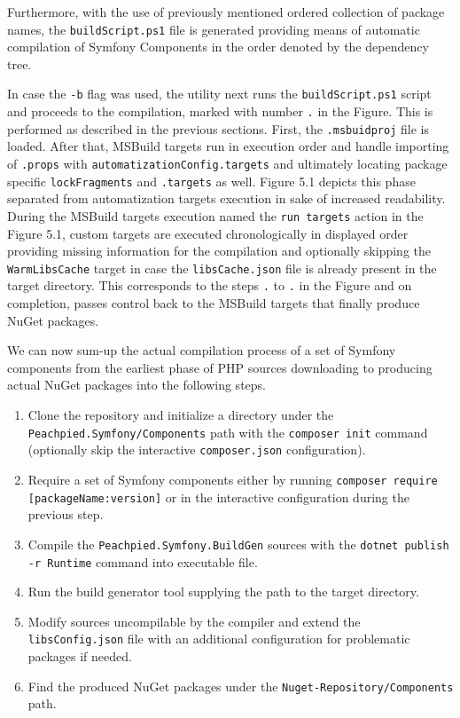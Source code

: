 Furthermore, with the use of previously mentioned ordered collection of package names, the \texttt{buildScript.ps1} file is generated providing means of automatic compilation of Symfony Components in the order denoted by the dependency tree. 

In case the \texttt{-b} flag was used, the utility next runs the \texttt{buildScript.ps1} script and proceeds to the compilation, marked with number \texttt{.} in the Figure. This is performed as described in the previous sections. First, the \texttt{.msbuidproj} file is loaded. After that, MSBuild targets run in execution order and handle importing of \texttt{.props} with \texttt{automatizationConfig.targets} and ultimately locating package specific \texttt{lockFragments} and \texttt{.targets} as well. Figure 5.1 depicts this phase separated from automatization targets execution in sake of increased readability. During the MSBuild targets execution named the \texttt{run targets} action in the Figure 5.1, custom targets are executed chronologically in displayed order providing missing information for the compilation and optionally skipping the \texttt{WarmLibsCache} target in case the \texttt{libsCache.json} file is already present in the target directory. This corresponds to the steps \texttt{.} to \texttt{.} in the Figure and on completion, passes control back to the MSBuild targets that finally produce NuGet packages.

We can now sum-up the actual compilation process of a set of Symfony components from the earliest phase of PHP sources downloading to producing actual NuGet packages into the following steps.

\begin{enumerate}[i:]
\item Clone the repository and initialize a directory under the \texttt{Peachpied.Symfony/Components} path with the \texttt{composer init} command (optionally skip the interactive \texttt{composer.json} configuration).
\item Require a set of Symfony components either by running \texttt{composer require [packageName:version]} or in the interactive configuration during the previous step.
\item Compile the \texttt{Peachpied.Symfony.BuildGen} sources with the \texttt{dotnet publish -r {Runtime}} command into executable file.
\item Run the build generator tool supplying the path to the target directory.
\item Modify sources uncompilable by the compiler and extend the \texttt{libsConfig.json} file with an additional configuration for problematic packages if needed.
\item Find the produced NuGet packages under the \texttt{Nuget-Repository/Components} path.
\end{enumerate}

